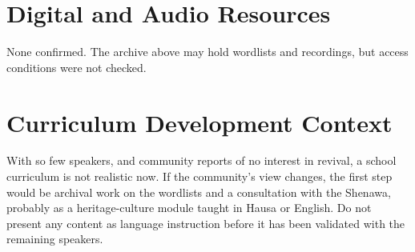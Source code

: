 \documentclass[12pt]{article}
\begin{document}
\section{Digital and Audio Resources}
None confirmed. The archive above may hold wordlists and recordings, but access conditions were not checked.

\section{Curriculum Development Context}
With so few speakers, and community reports of no interest in revival, a school curriculum is not realistic now. If the community's view changes, the first step would be archival work on the wordlists and a consultation with the Shenawa, probably as a heritage-culture module taught in Hausa or English. Do not present any content as language instruction before it has been validated with the remaining speakers.
\end{document}
